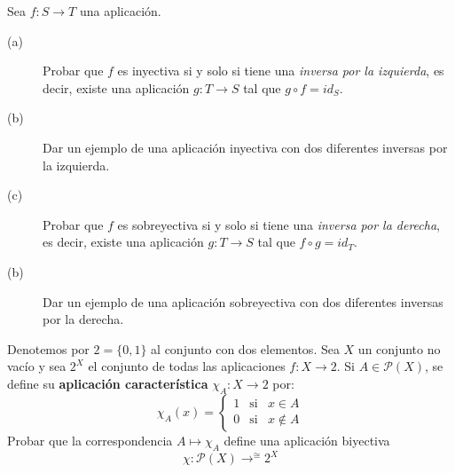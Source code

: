 \begin{ejercicio}
    Sea $f:S\to T$ una aplicación.
    \begin{description}
        \item [(a)] Probar que $f$ es inyectiva si y solo si tiene una \emph{inversa por la izquierda}, es decir, existe una aplicación $g:T\to S$ tal que $g\circ f = id_S$.
        \item [(b)] Dar un ejemplo de una aplicación inyectiva con dos diferentes inversas por la izquierda.
        \item [(c)] Probar que $f$ es sobreyectiva si y solo si tiene una \emph{inversa por la derecha}, es decir, existe una aplicación $g:T\to S$ tal que $f\circ g = id_T$.
        \item [(b)] Dar un ejemplo de una aplicación sobreyectiva con dos diferentes inversas por la derecha.
    \end{description}
\end{ejercicio}

\begin{ejercicio}
    Denotemos por $2=\{0,1\}$ al conjunto con dos elementos. Sea $X$ un conjunto no vacío y sea $2^X$ el conjunto de todas las aplicaciones $f:X\to 2$. Si $A\in \mathcal{P}(X)$, se define su \textbf{aplicación característica} $\chi_A:X\to 2$ por:
    \begin{equation*}
        \chi_A(x) = \left\{
            \begin{array}{ccl}
                1 & \text{si} & x\in A \\
                0 & \text{si} & x\notin A
            \end{array}\right.
    \end{equation*}
    Probar que la correspondencia $A\longmapsto \chi_A$ define una aplicación biyectiva
    \begin{equation*}
        \chi:\mathcal{P}(X) \mathop{\longrightarrow}^{\cong}2^X
    \end{equation*}
\end{ejercicio}

